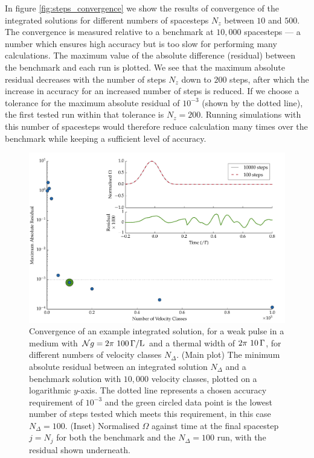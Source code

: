     In figure \ref{fig:steps_convergence} we show the results of convergence of
    the integrated solutions for different numbers of spacesteps $N_z$ between
    $10$ and $500$. The convergence is measured relative to a benchmark at
    $10,000$ spacesteps --- a number which ensures high accuracy but is too slow
    for performing many calculations. The maximum value of the absolute
    difference (residual) between the benchmark and each run is plotted. We see
    that the maximum absolute residual decreases with the number of steps $N_z$
    down to $200$ steps, after which the increase in accuracy for an
    increased number of steps is reduced. If we choose a tolerance for the
    maximum absolute residual of $10^{-3}$ (shown by the dotted line), the first
    tested run within that tolerance is $N_z = 200$. Running simulations with
    this number of spacesteps would therefore reduce calculation many times over
    the benchmark while keeping a sufficient level of accuracy.

    \begin{figure}
      \includegraphics[width=\linewidth]{figs/10_appendices/two_mb_thermal_solve_j_compare_fig1.pdf}
      \caption{
      Convergence of an example integrated solution, for a weak pulse in a
      medium with $\mathcal{N}g = \unit[2\pi~100]{\Gamma/L}$ and a thermal width
      of $\unit[2\pi~10]{\Gamma}$, for different numbers of velocity classes
      $N_\Delta$. (Main plot) The minimum absolute residual between an
      integrated solution $N_\Delta$ and a benchmark solution with $10,000$
      velocity classes, plotted on a logarithmic $y$-axis. The dotted line
      represents a chosen accuracy requirement of $10^{-3}$ and the green
      circled data point is the lowest number of steps tested which meets this
      requirement, in this case $N_\Delta = 100$. (Inset) Normalised $\Omega$
      against time at the final spacestep $j = N_j$ for both the benchmark and
      the $N_\Delta = 100$ run, with the residual shown underneath.
      }
      \label{fig:vel_convergence}
    \end{figure}

